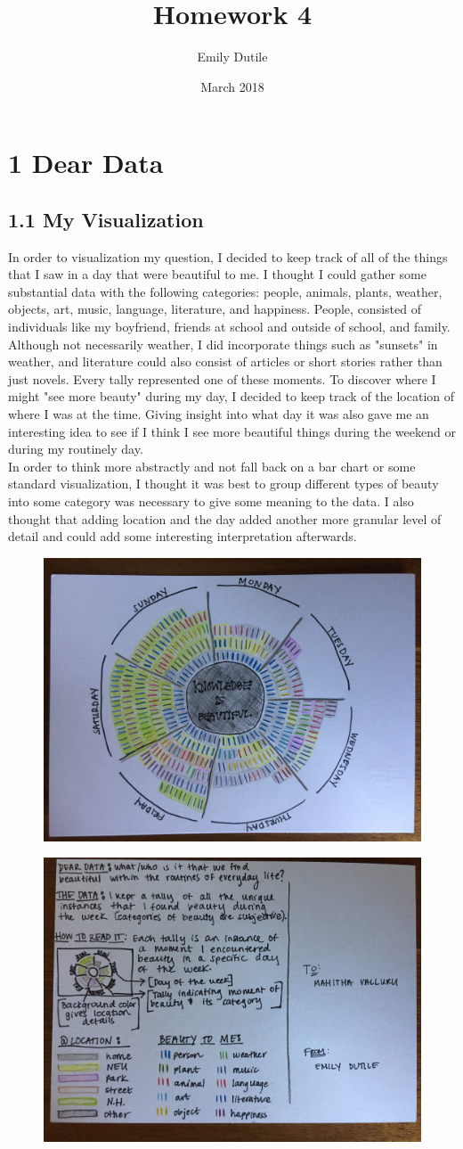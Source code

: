 \documentclass{neu_handout}
\title{Homework 4}
\author{Emily Dutile}
\date{March 2018}
\begin{document}
\section*{1 Dear Data}

\subsection*{1.1 My Visualization}

In order to visualization my question, I decided to keep track of all of the things that I saw in a day that were beautiful to me. I thought I could gather some substantial data with the following categories: people, animals, plants, weather, objects, art, music, language, literature, and happiness. People, consisted of individuals like my boyfriend, friends at school and outside of school, and family. Although not necessarily weather, I did incorporate things such as "sunsets" in weather, and literature could also consist of articles or short stories rather than just novels. Every tally represented one of these moments. To discover where I might "see more beauty" during my day, I decided to keep track of the location of where I was at the time. Giving insight into what day it was also gave me an interesting idea to see if I think I see more beautiful things during the weekend or during my routinely day.\\

In order to think more abstractly and not fall back on a bar chart or some standard visualization, I thought it was best to group different types of beauty into some category was necessary to give some meaning to the data. I also thought that adding location and the day added another more granular level of detail and could add some interesting interpretation afterwards.

\begin{figure}[h]
\centering
{
\includegraphics[width=0.4\linewidth]{myviz1}
}
\end{figure}

\begin{figure}[h]
\centering
{
\includegraphics[width=0.4\linewidth]{myviz2}
}
\end{figure}
\end{document}
